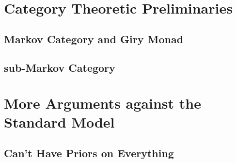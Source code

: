 \documentclass{article}
\begin{document}
	\section{Category Theoretic Preliminaries}
	\subsection{Markov Category and Giry Monad}
	
	\subsection{sub-Markov Category}
	
	\section{More Arguments against the Standard Model} %
	
	\subsection{Can't Have Priors on Everything}\label{sec:impossible-prior}
	
	
		
	
	
\end{document}
